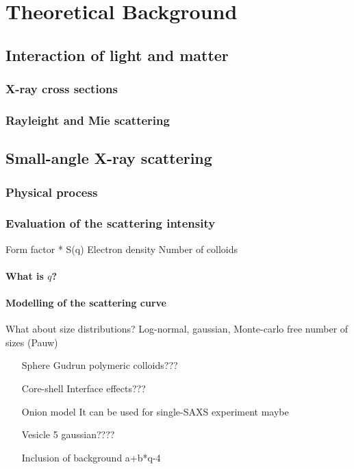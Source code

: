 \chapter{Theoretical Background}
\label{chap:theory_SAXS}
\blindtext[1]\cite{banc_origin_2015}
\section{Interaction of light and matter}
\subsection{X-ray cross sections}
\subsection{Rayleight and Mie scattering}

\section{Small-angle X-ray scattering}
\subsection{Physical process}
\subsection{Evaluation of the scattering intensity}
Form factor * S(q)
Electron density
Number of colloids
\subsubsection{What is $q$?}
\subsubsection{Modelling of the scattering curve}
What about size distributions? Log-normal, gaussian, Monte-carlo free number of sizes (Pauw)
\begin{itemize}
	\item [Sphere] Gudrun polymeric colloids???
	\item [Core-shell] Interface effects???
	\item [Onion model] It can be used for single-SAXS experiment maybe
	\item [Vesicle] 5 gaussian????
	\item [Inclusion of background] a+b*q-4
\end{itemize}

